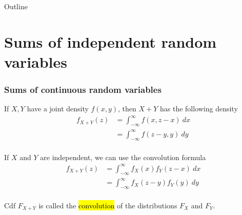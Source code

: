 \documentclass[slidestop,compress,mathserif]{beamer}
\begin{document}
%
\begin{frame}{Outline}
\tableofcontents[hideallsubsections]
\end{frame}

%








\section{Sums of independent random variables}
\begin{frame}\frametitle{Sums of continuous random variables}

If $X,Y$ have a joint density $f(x,y)$, then $X+Y$ has the following density
\begin{align*}
f_{X+Y}(z) &= \int_{-\infty}^\infty f(x,z-x)~dx \\
           &= \int_{-\infty}^\infty f(z-y,y)~dy \\
\end{align*}

\vspace{-0.3cm} \pause
If $X$ and $Y$ are independent, we can use the convolution formula
\begin{align*}
f_{X+Y}(z) &= \int_{-\infty}^\infty f_X(x)f_Y(z-x)~dx \\
           &= \int_{-\infty}^\infty f_X(z-y)f_Y(y)~dy \\
\end{align*}

\vspace{-0.3cm} \pause
Cdf $F_{X+Y}$ is called the \hl{convolution} of the distributions $F_X$ and $F_Y$.


\end{frame}
\end{document}
